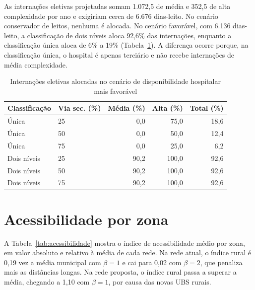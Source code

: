 As internações eletivas projetadas somam 1.072,5 de média e 352,5 de alta complexidade por ano e
exigiriam cerca de 6.676 dias-leito. No cenário conservador de leitos, nenhuma é alocada. No cenário
favorável, com 6.136 dias-leito, a classificação de dois níveis aloca 92,6\% das internações, enquanto a
classificação única aloca de 6\% a 19\% (Tabela~\ref{tab:leitos_otimista}). A diferença ocorre porque, na
classificação única, o hospital é apenas terciário e não recebe internações de média complexidade.

\begin{table}[htbp]\centering
\caption{Internações eletivas alocadas no cenário de disponibilidade hospitalar mais favorável}\label{tab:leitos_otimista}
\begin{tabular}{llrrr}\toprule Classificação & Via sec. (\%) & Média (\%) & Alta (\%) & Total (\%)\\\midrule
Única & 25 & 0,0 & 75,0 & 18,6\\
Única & 50 & 0,0 & 50,0 & 12,4\\
Única & 75 & 0,0 & 25,0 & 6,2\\
Dois níveis & 25 & 90,2 & 100,0 & 92,6\\
Dois níveis & 50 & 90,2 & 100,0 & 92,6\\
Dois níveis & 75 & 90,2 & 100,0 & 92,6\\
\bottomrule\end{tabular}
\end{table}

\section{Acessibilidade por zona}

A Tabela~\ref{tab:acessibilidade} mostra o índice de acessibilidade médio por zona, em valor absoluto e
relativo à média de cada rede. Na rede atual, o índice rural é 0,19 vez a média municipal com $\beta=1$ e
cai para 0,02 com $\beta=2$, que penaliza mais as distâncias longas. Na rede proposta, o índice rural
passa a superar a média, chegando a 1,10 com $\beta=1$, por causa das novas UBS rurais.

